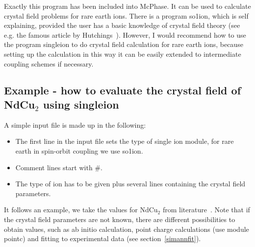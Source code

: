 \EE Exactly this program
 has been included into {\prg McPhase}. It  can be used  to 
calculate crystal field problems for rare earth ions. There is a program 
{\prg so1ion}, which is self explaining, provided 
the user has a basic knowledge of crystal field 
theory (see e.g. the famous article by Hutchings~\cite{hutchings64-227}).
However, I would recommend how to use the program {\prg singleion} to do crystal field calculation
for rare earth ions, because setting up the calculation in this way it
 can be easily extended to intermediate coupling schemes if necessary.

\subsection{Example - how to evaluate the crystal field of NdCu$_2$ using
 {\prg singleion}}\label{cfieldexample}


A simple input file is made up in the following:

\begin{itemize}
\item The first line in the input file sets the type of single ion module, for rare earth in spin-orbit
    coupling we use {\prg so1ion}.
\item Comment lines start with \#. 
\item The type of ion has to be given plus
several lines containing the crystal field parameters. 
\end{itemize}

It follows an example, we take the values
for NdCu$_2$ from literature~\cite{gratz91-9297}. Note that
if the crystal field parameters are not known, there are different
possibilities to obtain values, such as ab initio calculation,
point charge calculations (use module {\prg pointc}) and fitting
to experimental data (see section~\ref{simannfit}).


